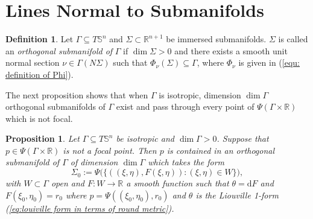 \documentclass[12pt]{amsart}
\theoremstyle{plain}
\newtheorem{Prop}{Proposition}
\theoremstyle{definition}
\newtheorem{Def}{Definition}
\def\S{\mathbb{S}}
\newcommand{\td}{\mathrm{d}}
\numberwithin{equation}{section}
\begin{document}
\section{Lines Normal to Submanifolds}
\label{sec: lines normal to submanifolds}
\begin{Def}\label{def: orthogonal surface}
    Let $\Gamma\subseteq T\S^n$ and $\Sigma\subset\mathbb{R}^{n+1}$ be immersed submanifolds. $\Sigma$ is called an \emph{orthogonal submanifold of} $\Gamma$ if $\dim \Sigma>0$ and there exists a smooth unit normal section $\nu\in\Gamma (N\Sigma)$ such that $\Phi_\nu(\Sigma)\subseteq\Gamma$, where $\Phi_\nu$ is given in (\ref{equ: definition of Phi}).
\end{Def}
The next proposition shows that when $\Gamma$ is isotropic, dimension $\dim \Gamma$ orthogonal submanifolds of $\Gamma$ exist and pass through every point of $\Psi(\Gamma\times\mathbb{R})$ which is not focal.
 \begin{Prop} \label{prop: isotropic implies existance of orthogonal sub manifolds}
Let $\Gamma\subseteq T\mathbb{S}^n$ be isotropic and $\dim \Gamma>0$. Suppose that $p\in\Psi(\Gamma\times\mathbb{R})$ is not a focal point. Then $p$ is contained in an orthogonal submanifold of $\Gamma$ of dimension $\dim \Gamma$ which takes the form
\[
\Sigma_0:=\Psi\Big(\Big\{((\xi,\eta),F(\xi,\eta)): (\xi,\eta)\in W\Big\}\Big),
\]
with $W\subset \Gamma$ open and $F:W\to \mathbb{R}$ a smooth function such that $\theta=\td F$ and $F(\xi_0,\eta_0)=r_0$ where $p=\Psi((\xi_0,\eta_0),r_0)$ and $\theta$ is the Liouville 1-form (\ref{eq:louiville form in terms of round metric}).
\end{Prop}
\end{document}
